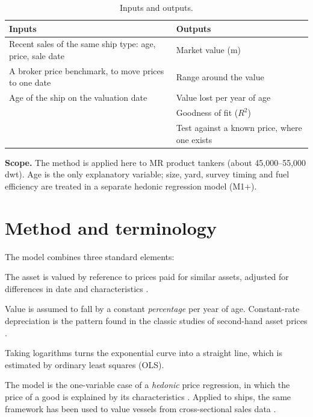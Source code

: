 \documentclass[11pt,a4paper]{article}
\newcommand{\usd}[1]{\text{US\$}#1}
\begin{document}
\begin{table}[h]
\centering
\caption{Inputs and outputs.}
\label{tab:io}
\begin{tabularx}{\linewidth}{@{}XX@{}}
\toprule
Inputs & Outputs \\
\midrule
Recent sales of the same ship type: age, price, sale date & Market value (\usd{}m) \\
A broker price benchmark, to move prices to one date & Range around the value \\
Age of the ship on the valuation date & Value lost per year of age \\
 & Goodness of fit ($R^2$) \\
 & Test against a known price, where one exists \\
\bottomrule
\end{tabularx}
\end{table}

\textbf{Scope.} The method is applied here to MR product tankers (about 45,000--55,000 dwt). Age is the only explanatory variable; size, yard, survey timing and fuel efficiency are treated in a separate hedonic regression model (M1+).

\section{Method and terminology}

The model combines three standard elements:

\begin{description}[leftmargin=0pt,font=\normalfont\bfseries]
\item[Comparable sales method (market approach).] The asset is valued by reference to prices paid for similar assets, adjusted for differences in date and characteristics \citep{IVS105}.
\item[Exponential (geometric) depreciation.] Value is assumed to fall by a constant \emph{percentage} per year of age. Constant-rate depreciation is the pattern found in the classic studies of second-hand asset prices \citep{HultenWykoff1981a,HultenWykoff1981b}.
\item[Log-linear regression by ordinary least squares.] Taking logarithms turns the exponential curve into a straight line, which is estimated by ordinary least squares (OLS).
\end{description}

The model is the one-variable case of a \emph{hedonic} price regression, in which the price of a good is explained by its characteristics \citep{Court1939,Griliches1961,Rosen1974}. Applied to ships, the same framework has been used to value vessels from cross-sectional sales data \citep{AdlandKoekebakker2007}.
\end{document}
